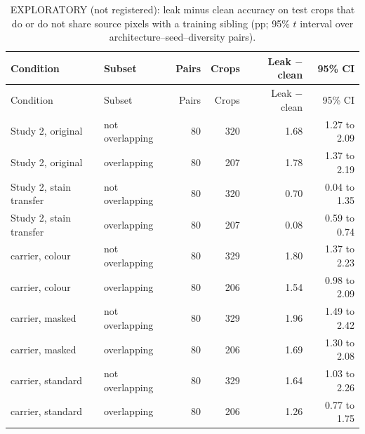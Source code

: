 {\footnotesize
\setlength{\tabcolsep}{3.5pt}
\begin{longtable}{llrrrr}
\caption{EXPLORATORY (not registered): leak minus clean accuracy on test crops that do or do not share source pixels with a training sibling (pp; 95\% $t$ interval over architecture--seed--diversity pairs).}\label{r:tab:overlap}\\
\toprule
Condition & Subset & Pairs & Crops & Leak $-$ clean & 95\% CI \\
\midrule
\endfirsthead
\toprule
Condition & Subset & Pairs & Crops & Leak $-$ clean & 95\% CI \\
\midrule
\endhead
\bottomrule
\endfoot
Study 2, original & not overlapping & 80 & 320 & 1.68 & 1.27 to 2.09 \\
Study 2, original & overlapping & 80 & 207 & 1.78 & 1.37 to 2.19 \\
Study 2, stain transfer & not overlapping & 80 & 320 & 0.70 & 0.04 to 1.35 \\
Study 2, stain transfer & overlapping & 80 & 207 & 0.08 & \textminus{}0.59 to 0.74 \\
carrier, colour & not overlapping & 80 & 329 & 1.80 & 1.37 to 2.23 \\
carrier, colour & overlapping & 80 & 206 & 1.54 & 0.98 to 2.09 \\
carrier, masked & not overlapping & 80 & 329 & 1.96 & 1.49 to 2.42 \\
carrier, masked & overlapping & 80 & 206 & 1.69 & 1.30 to 2.08 \\
carrier, standard & not overlapping & 80 & 329 & 1.64 & 1.03 to 2.26 \\
carrier, standard & overlapping & 80 & 206 & 1.26 & 0.77 to 1.75 \\
\end{longtable}
}
